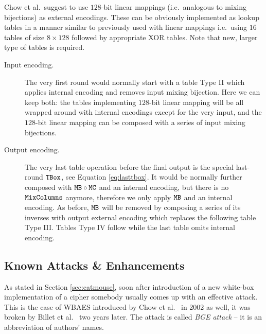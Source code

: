 	Chow et al.\ suggest to use $128$-bit linear mappings (i.e.\ analogous to mixing bijections) as external encodings. These can be obviously implemented as lookup tables in a manner similar to previously used with linear mappings i.e.\ using $16$ tables of size $8\times 128$ followed by appropriate XOR tables. Note that new, larger type of tables is required.
	
	\begin{description}
		\item[Input encoding.] The very first round would normally start with a table Type II which applies internal encoding and removes input mixing bijection. Here we can keep both: the tables implementing $128$-bit linear mapping will be all wrapped around with internal encodings except for the very input, and the $128$-bit linear mapping can be composed with a series of input mixing bijections.
		\item[Output encoding.] The very last table operation before the final output is the special last-round $\texttt{TBox}$, see Equation \ref{eq:lasttbox}. It would be normally further composed with $\texttt{MB}\circ\texttt{MC}$ and an internal encoding, but there is no $\texttt{MixColumns}$ anymore, therefore we only apply $\texttt{MB}$ and an internal encoding. As before, $\texttt{MB}$ will be removed by composing a series of its inverses with output external encoding which replaces the following table Type III. Tables Type IV follow while the last table omits internal encoding.
	\end{description}
	



\subsection{Known Attacks \& Enhancements}
\label{sec:known}

As stated in Section \ref{sec:catmouse}, soon after introduction of a new white-box implementation of a cipher somebody usually comes up with an effective attack. This is the case of WBAES introduced by Chow et al.\ \cite{chow2002aes} in 2002 as well, it was broken by Billet et al.\ \cite{billet2004cryptanalysis} two years later. The attack is called {\em BGE attack} -- it is an abbreviation of authors' names.

